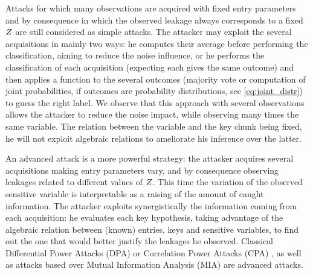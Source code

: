 \begin{remark}
Attacks for which many observations are acquired with fixed entry parameters and by consequence in which the observed leakage always corresponds to a fixed $Z$ are still considered as simple attacks. The attacker may exploit the several acquisitions in mainly two ways: he computes their average before performing the classification, aiming to reduce the noise influence, or he performs the classification of each acquisition (expecting each gives the same outcome) and then applies a function to the several outcomes (\eg majority vote or computation of joint probabilities, if outcomes are probability distributions, see \ref{eq:joint_distr}) to guess the right label. We observe that this approach with several observations allows the attacker to reduce the noise impact, while observing many times the same variable. The relation between the variable and the key chunk being fixed, he will not exploit algebraic relations to ameliorate his inference over the latter.
\end{remark}
An advanced attack is a more powerful strategy: the attacker acquires several acquisitions making entry parameters vary, and by consequence observing leakages related to different values of $Z$. This time the variation of the observed sensitive variable is interpretable as a raising of the amount of caught information. The attacker exploits synergistically the information coming from each acquisition: he evaluates each key hypothesis, taking advantage of the algebraic relation between (known) entries, keys and sensitive variables, to find out the one that would better justify the leakages he observed. Classical Differential Power Attacks (DPA) \cite{brier2004correlation} or Correlation Power Attacks (CPA) \cite{brier2004correlation}, as well as attacks based over Mutual Information Analysis (MIA) \cite{batina2011mutual} are advanced attacks. 

